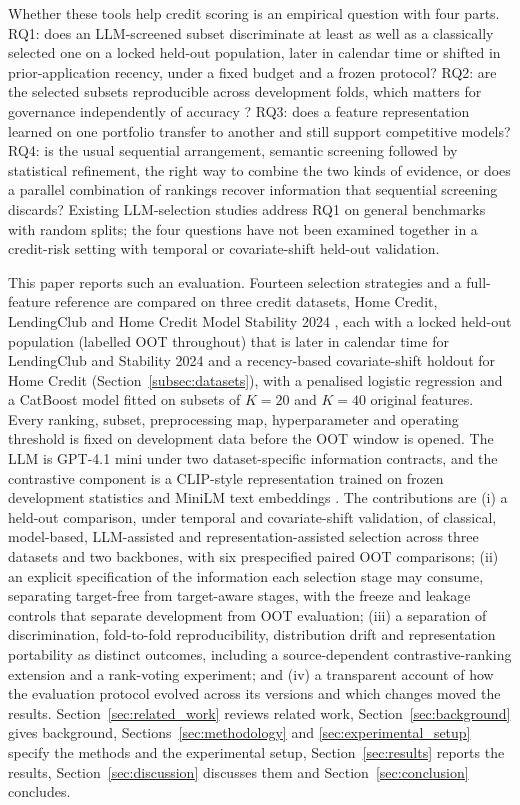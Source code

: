 \documentclass[final,5p,twocolumn]{elsarticle}
\newcommand{\Kfeat}{K}
\begin{document}
Whether these tools help credit scoring is an empirical question with four parts. RQ1: does an LLM-screened subset discriminate at least as well as a classically selected one on a locked held-out population, later in calendar time or shifted in prior-application recency, under a fixed budget and a frozen protocol? RQ2: are the selected subsets reproducible across development folds, which matters for governance independently of accuracy \cite{kalousis2007,nogueira2018}? RQ3: does a feature representation learned on one portfolio transfer to another and still support competitive models? RQ4: is the usual sequential arrangement, semantic screening followed by statistical refinement, the right way to combine the two kinds of evidence, or does a parallel combination of rankings recover information that sequential screening discards? Existing LLM-selection studies address RQ1 on general benchmarks with random splits; the four questions have not been examined together in a credit-risk setting with temporal or covariate-shift held-out validation.

This paper reports such an evaluation. Fourteen selection strategies and a full-feature reference are compared on three credit datasets, Home Credit, LendingClub and Home Credit Model Stability 2024 \cite{homecredit2018,lendingclub_kaggle,homecredit2024}, each with a locked held-out population (labelled OOT throughout) that is later in calendar time for LendingClub and Stability 2024 and a recency-based covariate-shift holdout for Home Credit (Section~\ref{subsec:datasets}), with a penalised logistic regression and a CatBoost model \cite{prokhorenkova2018} fitted on subsets of $\Kfeat=20$ and $\Kfeat=40$ original features. Every ranking, subset, preprocessing map, hyperparameter and operating threshold is fixed on development data before the OOT window is opened. The LLM is GPT-4.1 mini \cite{openai2025gpt41} under two dataset-specific information contracts, and the contrastive component is a CLIP-style representation trained on frozen development statistics and MiniLM text embeddings \cite{wang2020minilm,reimers2019}. The contributions are (i) a held-out comparison, under temporal and covariate-shift validation, of classical, model-based, LLM-assisted and representation-assisted selection across three datasets and two backbones, with six prespecified paired OOT comparisons; (ii) an explicit specification of the information each selection stage may consume, separating target-free from target-aware stages, with the freeze and leakage controls that separate development from OOT evaluation; (iii) a separation of discrimination, fold-to-fold reproducibility, distribution drift and representation portability as distinct outcomes, including a source-dependent contrastive-ranking extension and a rank-voting experiment; and (iv) a transparent account of how the evaluation protocol evolved across its versions and which changes moved the results. Section~\ref{sec:related_work} reviews related work, Section~\ref{sec:background} gives background, Sections~\ref{sec:methodology} and \ref{sec:experimental_setup} specify the methods and the experimental setup, Section~\ref{sec:results} reports the results, Section~\ref{sec:discussion} discusses them and Section~\ref{sec:conclusion} concludes.
\end{document}
